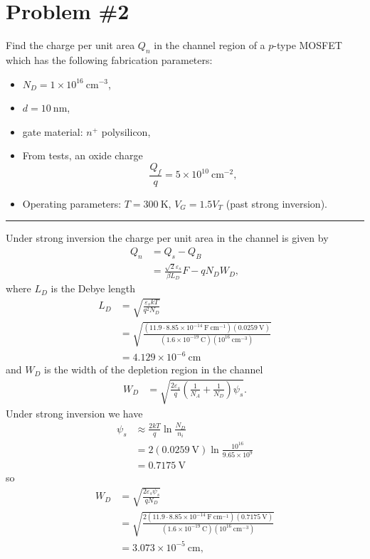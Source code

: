 \documentclass{article}
\newcommand{\horline}
           {\begin{center}
              \noindent\rule{8cm}{0.4pt}
            \end{center}}
\begin{document}
\pagebreak

\section*{Problem \#2}
Find the charge per unit area $Q_n$ in the channel region of a $p$-type MOSFET
which has the following fabrication parameters:
\begin{itemize}
  \item{$N_D = 1 \times 10^{16} ~\mathrm{cm}^{-3}$,}
  \item{$d = 10 ~\mathrm{nm}$,}
  \item{gate material: $n^+$ polysilicon,}
  \item{From tests, an oxide charge 
        $$
        \frac{Q_f}{q} = 5 \times 10^{10} ~\mathrm{cm}^{-2},
        $$
       }
  \item{Operating parameters: $T = 300 ~\mathrm{K}$, $V_G = 1.5 V_T$ 
        (past strong inversion).}
\end{itemize}
\horline
Under strong inversion the charge per unit area in the channel 
is given by 
\begin{align*}
Q_n &= Q_s - Q_B \\
    &= \frac{\sqrt{2} \varepsilon_s}{\beta L_D}F - qN_D W_D,
\end{align*}
where $L_D$ is the Debye length
\begin{align*}
L_D &= \sqrt{\frac{\varepsilon_s kT}{q^2 N_D}} \\
    &= \sqrt{\frac{(11.9 \cdot 8.85 \times 10^{-14} ~\mathrm{F} ~\mathrm{cm}^{-1})
                   (0.0259 ~\mathrm{V})}
                  {(1.6 \times 10^{-19} ~\mathrm{C})
                   (10^{16} ~\mathrm{cm}^{-3})}} \\
    &= 4.129 \times 10^{-6} ~\mathrm{cm}
\end{align*}
and $W_D$ is the width of the depletion region in the channel
\begin{align*}
W_{D} &= \sqrt{\frac{2\varepsilon_s}{q} 
               \left(\frac{1}{N_A} + \frac{1}{N_D}
               \right)\psi_s }.
\end{align*}
Under strong inversion we have 
\begin{align*}
\psi_s &\approx \frac{2kT}{q} \ln \frac{N_D}{n_i} \\
       &= 2(0.0259 ~\mathrm{V}) \ln \frac{10^{16}}{9.65 \times 10^9} \\
       &= 0.7175 ~\mathrm{V}
\end{align*}
so
\begin{align*}
W_D &= \sqrt{\frac{2 \varepsilon_s \psi_s}
                    {q N_D} } \\
    &= \sqrt{\frac{2(11.9 \cdot 8.85 \times 10^{-14} ~\mathrm{F}~\mathrm{cm}^{-1})
                    (0.7175 ~\mathrm{V})}
                  {(1.6 \times 10^{-19} ~\mathrm{C})
                   (10^{16} ~\mathrm{cm}^{-3})}} \\
    &= 3.073 \times 10^{-5} ~\mathrm{cm},
\end{align*}
\end{document}
